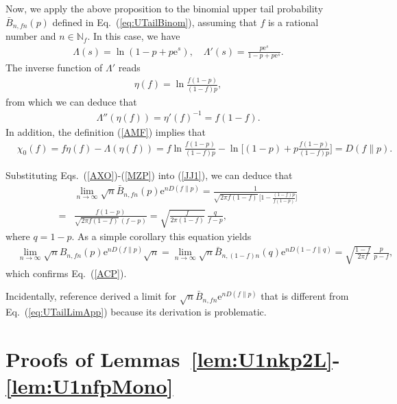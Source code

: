 \documentclass[aop]{imsart}
\theoremstyle{plain}
\theoremstyle{remark}
\newcommand{\rme}{\mathrm{e}}
\newcommand{\bbN}{\mathbb{N}}
\newcommand{\1}{\operatorname{\uppercase\expandafter{\romannumeral1}}}
\newcommand{\2}{\operatorname{\uppercase\expandafter{\romannumeral2}}}
\newcommand{\3}{\operatorname{\uppercase\expandafter{\romannumeral3}}}
\newcommand{\4}{\operatorname{\uppercase\expandafter{\romannumeral4}}}
\newcommand{\5}{\operatorname{\uppercase\expandafter{\romannumeral5}}}
\newcommand{\6}{\operatorname{\uppercase\expandafter{\romannumeral6}}}
\newcommand{\7}{\operatorname{\uppercase\expandafter{\romannumeral7}}}
\newcommand{\8}{\operatorname{\uppercase\expandafter{\romannumeral8}}}
\newcommand{\9}{\operatorname{\uppercase\expandafter{\romannumeral9}}}
\def\eqref#1{\textup{(\ref{#1})}}
\newcommand{\eref}[1]{Eq.~\textup{(\ref{#1})}}
\newcommand{\lsref}[1]{Lemmas~\ref{#1}}
\begin{document}
\begin{appendix}
Now, we apply the above proposition to the 
binomial upper tail probability $\bar{B}_{n,fn}(p)$ defined in \eref{eq:UTailBinom}, assuming that $f$ is a rational number and $n\in \bbN_f$.
In this case, we have
\begin{align}
\Lambda(s)= \ln(1-p+ p\rme^s), \quad \Lambda'(s)= \frac{p\rme^s}{1-p+ p\rme^s}. 
\end{align}
The inverse function of $\Lambda'$ reads
\begin{align}
\eta(f)=\ln \frac{f(1-p)}{(1-f)p},\label{AXO}
\end{align}
from which we can deduce  that
\begin{align}
\Lambda''(\eta(f))=\eta'(f)^{-1}=f(1-f).\label{AJI}
\end{align}
In addition, the definition \eqref{AMF} implies that 
\begin{align}\label{MZP}
&\chi_0(f)=f \eta(f) - \Lambda (\eta (f))=f \ln \frac{f(1-p)}{(1-f)p}-
\ln \biggl[ (1-p)+ p\frac{f(1-p)}{(1-f)p}\biggr]
= D(f\|p ).
\end{align}



Substituting Eqs.~\eqref{AXO}-\eqref{MZP} into 
\eqref{JJ1}, we can deduce that
\begin{align}
&\lim_{n \to \infty} \sqrt{n} \bar{B}_{n,fn}(p)\rme^{nD (f\|p)}
=\frac{1}{\sqrt{2\pi f(1-f)}\,\bigl[1-
	\frac{(1-f)p}{f(1-p)}
	\bigr] } \label{eq:UTailLimApp}\\
=&\frac{{f(1-p)}}{\sqrt{2\pi f(1-f)}\, (
f-p)}
=\sqrt{\frac{f}{2\pi (1-f)}}\,\frac{q}{f-p},  \nonumber
\end{align}
where $q=1-p$. 
As a simple corollary this equation yields 
\begin{align}
&\lim_{n \to \infty} \sqrt{n} B_{n,fn}(p)\rme^{nD (f\|p)}\sqrt{n}=\lim_{n \to \infty} \sqrt{n} \bar{B}_{n,(1-f)n}(q)\rme^{nD (1-f\|q)}
=\sqrt{\frac{1-f}{2\pi f}}\,\frac{p}{p-f},
\end{align}
which confirms \eref{ACP}. 

Incidentally,  reference 
\cite[(5.41)]{Moul17} derived a 
 limit for $\sqrt{n}\bar{B}_{n,fn}\rme^{nD (f\|p)}$ that is different from \eref{eq:UTailLimApp} because 
its derivation is problematic.





\section{\label{app:LUproperties}Proofs of \lsref{lem:U1nkp2L}-\ref{lem:U1nfpMono}}


\end{appendix}
\end{document}
